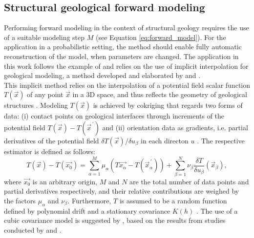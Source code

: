         \subsection{Structural geological forward modeling}\label{sec:struc_geo_modeling}       
        Performing forward modeling in the context of structural geology requires the use of a suitable modeling step $M$ (see Equation \ref{eq:forward_model}). For the application in a probabilistic setting, the method should enable fully automatic reconstruction of the model, when parameters are changed. The application in this work follows the example of \citet{delaVarga2016} and relies on the use of implicit interpolation for geological modeling, a method developed and elaborated by \citet{lajaunie1997foliation} and \citet{calcagno2008geological}.\\
        This implicit method relies on the interpolation of a potential field scalar function $T(\vec{x})$ of any point $\vec{x}$ in a 3D space, and thus reflects the geometry of geological structures \citep{calcagno2008geological}. Modeling $T(\vec{x})$ is achieved by cokriging that regards two forms of data: (i) contact points on geological interfaces through increments of the potential field $T(\vec{x})-T(\vec{x}^{\,'})$ and (ii) orientation data as gradients, i.e. partial derivatives of the potential field $\delta T(\vec{x})/\delta u_\beta$ in each directon $u$ \citep{calcagno2008geological}. The respective estimator is defined as follows:
        \begin{equation}\label{eq:Cokriging_Estimator}
                T(\vec{x})-T(\vec{x_0})=\sum_{\alpha=1}^{M}\mu_\alpha(T\vec{x_\alpha}-T(\vec{x}^{\,'}_\alpha))+\sum_{\beta=1}^{N}\nu_\beta\frac{\delta T}{\delta u_\beta}(\vec{x}_\beta),
        \end{equation}        
        where $\vec{x_0}$ is an arbitrary origin, $M$ and $N$ are the total number of data points and partial derivatives respectively, and their relative contributions are weighed by the factors $\mu_\alpha$ and $\nu_\beta$. Furthermore, $T$ is assumed to be a random function defined by polynomial drift and a stationary covariance $K(h)$ \citep{calcagno2008geological}. The use of a cubic covariance model is suggested by \citet{calcagno2008geological}, based on the results from studies conducted by \citet{aug2004modelisation} and \citet{chiles2004modelling}.
